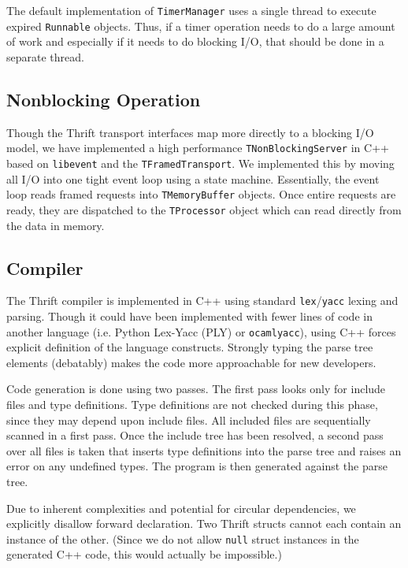 \documentclass[nocopyrightspace,blockstyle]{sigplanconf}
\begin{document}
The default implementation of \texttt{TimerManager} uses a single thread to
execute expired \texttt{Runnable} objects. Thus, if a timer operation needs to 
do a large amount of work and especially if it needs to do blocking I/O,
that should be done in a separate thread.

\subsection{Nonblocking Operation}
Though the Thrift transport interfaces map more directly to a blocking I/O
model, we have implemented a high performance \texttt{TNonBlockingServer}
in C++ based on \texttt{libevent} and the \texttt{TFramedTransport}. We
implemented this by moving all I/O into one tight event loop using a
state machine. Essentially, the event loop reads framed requests into
\texttt{TMemoryBuffer} objects. Once entire requests are ready, they are
dispatched to the \texttt{TProcessor} object which can read directly from
the data in memory.

\subsection{Compiler}
The Thrift compiler is implemented in C++ using standard \texttt{lex}/\texttt{yacc}
lexing and parsing. Though it could have been implemented with fewer
lines of code in another language (i.e. Python Lex-Yacc (PLY) or \texttt{ocamlyacc}), using C++
forces explicit definition of the language constructs. Strongly typing the
parse tree elements (debatably) makes the code more approachable for new
developers.

Code generation is done using two passes. The first pass looks only for
include files and type definitions. Type definitions are not checked during
this phase, since they may depend upon include files. All included files
are sequentially scanned in a first pass. Once the include tree has been
resolved, a second pass over all files is taken that inserts type definitions
into the parse tree and raises an error on any undefined types. The program is
then generated against the parse tree.

Due to inherent complexities and potential for circular dependencies,
we explicitly disallow forward declaration. Two Thrift structs cannot
each contain an instance of the other. (Since we do not allow \texttt{null}
struct instances in the generated C++ code, this would actually be impossible.)
\end{document}
